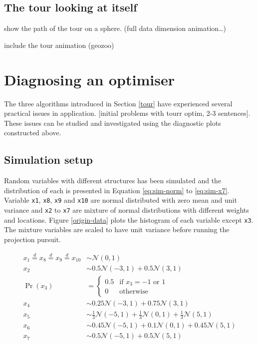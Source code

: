 \documentclass[12pt]{article}
\begin{document}
\hypertarget{the-tour-looking-at-itself}{%
\subsection{The tour looking at
itself}\label{the-tour-looking-at-itself}}

show the path of the tour on a sphere. (full data dimension
animation\ldots{})

include the tour animation (geozoo)

\newpage

\hypertarget{application}{%
\section{Diagnosing an optimiser}\label{application}}

The three algorithms introduced in Section \ref{tour} have experienced
several practical issues in application. {[}initial problems with tourr
optim, 2-3 sentences{]}. These issues can be studied and investigated
using the diagnostic plots constructed above.

\hypertarget{simulation-setup}{%
\subsection{Simulation setup}\label{simulation-setup}}

Random variables with different structures has been simulated and the
distribution of each is presented in Equation \ref{eq:sim-norm} to
\ref{eq:sim-x7}. Variable \texttt{x1}, \texttt{x8}, \texttt{x9} and
\texttt{x10} are normal distributed with zero mean and unit variance and
\texttt{x2} to \texttt{x7} are mixture of normal distributions with
different weights and locations. Figure \ref{origin-data} plots the
histogram of each variable except \texttt{x3}. The mixture variables are
scaled to have unit variance before running the projection pursuit.

\begin{align}
x_1 \overset{d}{=} x_8 \overset{d}{=} x_9 \overset{d}{=} x_{10}& \sim \mathcal{N}(0, 1) \label{eq:sim-norm} \\
x_2 &\sim 0.5 \mathcal{N}(-3, 1) + 0.5 \mathcal{N}(3, 1)\label{eq:sim-x2}\\
\Pr(x_3) &= 
\begin{cases}
0.5 & \text{if $x_3 = -1$ or $1$}\\
0 & \text{otherwise}
\end{cases}\label{eq:sim-x3}\\
x_4 &\sim 0.25 \mathcal{N}(-3, 1) + 0.75 \mathcal{N}(3, 1) \label{eq:sim-x4}\\
x_5 &\sim \frac{1}{3} \mathcal{N}(-5, 1) + \frac{1}{3} \mathcal{N}(0, 1) + \frac{1}{3} \mathcal{N}(5, 1)\label{eq:sim-x5}\\
x_6 &\sim 0.45 \mathcal{N}(-5, 1) + 0.1 \mathcal{N}(0, 1) + 0.45 \mathcal{N}(5, 1)\label{eq:sim-x6}\\
x_7 &\sim 0.5 \mathcal{N}(-5, 1) + 0.5 \mathcal{N}(5, 1) 
\label{eq:sim-x7}
\end{align}
\end{document}
